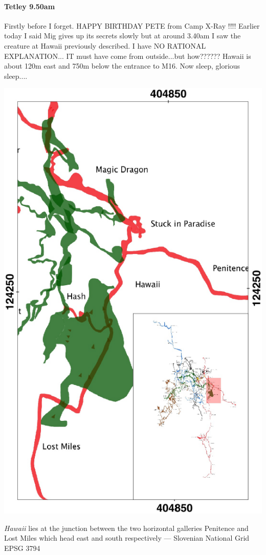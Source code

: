 \paragraph{Tetley 9.50am}
Firstly before I forget.
HAPPY BIRTHDAY PETE
from Camp X-Ray !!!!
Earlier today I said Mig gives up its secrets slowly but at around 3.40am I saw the creature at Hawaii previously described. I have NO RATIONAL EXPLANATION... IT must have come from outside...but how??????
Hawaii is about 120m east and 750m below the entrance to M16. Now sleep, glorious sleep....

\begin{marginfigure}
\checkoddpage \ifoddpage \forcerectofloat \else \forceversofloat \fi
\centering
\includegraphics[width=\textwidth]{2013/tetley-sam-2013/hawaii_inset.pdf}
\caption{\emph{Hawaii} lies at the junction between the two horizontal galleries Penitence and Lost Miles which head east and south  respectively --- Slovenian National Grid EPSG 3794 }
\label{small inset}
\end{marginfigure}

